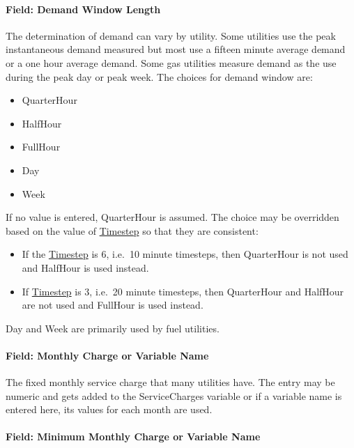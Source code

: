 \paragraph{Field: Demand Window Length}\label{field-demand-window-length-000}

The determination of demand can vary by utility. Some utilities use the peak instantaneous demand measured but most use a fifteen minute average demand or a one hour average demand. Some gas utilities measure demand as the use during the peak day or peak week. The choices for demand window are:

\begin{itemize}
\item
  QuarterHour
\item
  HalfHour
\item
  FullHour
\item
  Day
\item
  Week
\end{itemize}

If no value is entered, QuarterHour is assumed. The choice may be overridden based on the value of \hyperref[timestep]{Timestep} so that they are consistent:
\begin{itemize}
\item
    If the \hyperref[timestep]{Timestep} is 6, i.e.~10 minute timesteps, then QuarterHour is not used and HalfHour is used instead.
\item
    If \hyperref[timestep]{Timestep} is 3, i.e.~20 minute timesteps, then QuarterHour and HalfHour are not used and FullHour is used instead.
\end{itemize}

Day and Week are primarily used by fuel utilities.

\paragraph{Field: Monthly Charge or Variable Name}\label{field-monthly-charge-or-variable-name}

The fixed monthly service charge that many utilities have. The entry may be numeric and gets added to the ServiceCharges variable or if a variable name is entered here, its values for each month are used.

\paragraph{Field: Minimum Monthly Charge or Variable Name}\label{field-minimum-monthly-charge-or-variable-name}

